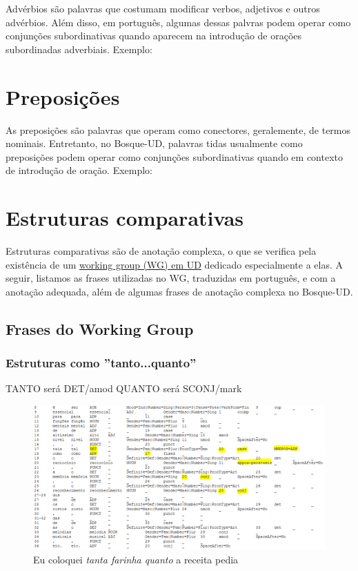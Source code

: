 \documentclass[output=paper,colorlinks,citecolor=brown]{langscibook}
\begin{document}
Advérbios são palavras que costumam modificar verbos, adjetivos e outros advérbios. Além disso, em português, algumas dessas palvras podem operar como conjunções subordinativas quando aparecem na introdução de orações subordinadas adverbiais. Exemplo:

\section{Preposições}

As preposições são palavras que operam como conectores, geralemente, de termos nominais. Entretanto, no Bosque-UD, palavras tidas usualmente como preposições podem operar como conjunções subordinativas quando em contexto de introdução de oração. Exemplo:


\section{Estruturas comparativas}

Estruturas comparativas são de anotação complexa, o que se verifica pela existência de um \href{https://universaldependencies.org/workgroups/comparatives.html}{working group (WG) em UD} dedicado especialmente a elas. A seguir, listamos as frases utilizadas no WG, traduzidas em português, e com a anotação adequada, além de algumas frases de anotação complexa no Bosque-UD.

\subsection{Frases do Working Group}

\subsubsection{Estruturas como ''tanto...quanto''}

TANTO será DET/amod
QUANTO será SCONJ/mark

\begin{figure}
    \centering
    \includegraphics[width=\textwidth,height=\textheight,keepaspectratio]{imagesDrive/image20.png}
    \caption{Eu coloquei \emph{tanta farinha quanto} a receita pedia}
    \label{fig:comparative1}
    \end{figure}{}
\end{document}
